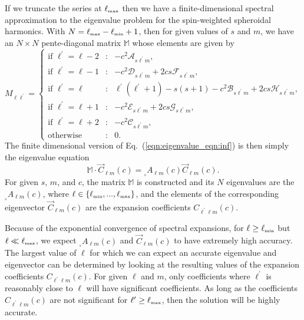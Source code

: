\documentclass[11pt]{article}
\newcommand{\scA}[4][]{{}_{{}_{#2}}A^{#1}_{#3}(#4)}
\begin{document}
If we truncate the series at $\ell_{\mbox{\tiny max}}$ then we have a
finite-dimensional spectral approximation to the eigenvalue problem
for the spin-weighted spheroidal harmonics.  With 
$N=\ell_{\mbox{\tiny max}} - \ell_{\mbox{\tiny min}} + 1$, then for
given values of $s$ and $m$, we have an $N\times{N}$ pente-diagonal
matrix $\mathbb{M}$ whose elements are given by
\begin{equation}
  M_{\ell\ell^\prime} = \left\{\begin{array}{lcl}
  \mbox{if\ }\ell^\prime=\ell-2 &:& -c^2 \mathcal{A}_{s\ell^\prime{m}}, \\
  \mbox{if\ }\ell^\prime=\ell-1 &:& -c^2 \mathcal{D}_{s\ell^\prime{m}} 
                                   + 2cs \mathcal{F}_{s\ell^\prime{m}} ,\\
  \mbox{if\ }\ell^\prime=\ell &:& \ell^\prime(\ell^\prime+1)-s(s+1)
                                   - c^2 \mathcal{B}_{s\ell^\prime{m}} 
                                   + 2cs \mathcal{H}_{s\ell^\prime{m}}, \\
  \mbox{if\ }\ell^\prime=\ell+1 &:& -c^2 \mathcal{E}_{s\ell^\prime{m}} 
                                   + 2cs \mathcal{G}_{s\ell^\prime{m}}, \\
  \mbox{if\ }\ell^\prime=\ell+2 &:& -c^2 \mathcal{C}_{s\ell^\prime{m}}, \\
  \mbox{otherwise} &:& 0.
  \end{array}\right.
\end{equation}
The finite dimensional version of Eq.~(\ref{eqn:eigenvalue_eqn:inf}) is 
then simply the eigenvalue equation
\begin{equation}\label{eqn::eigenvalue_eqn:fin}
  \mathbb{M}\cdot\vec{C}_{\ell{m}}(c) = \scA{s}{\ell{m}}{c}\vec{C}_{\ell{m}}(c).
\end{equation}
For given $s$, $m$, and $c$, the matrix $\mathbb{M}$ is constructed
and its $N$ eigenvalues are the $\scA{s}{\ell{m}}{c}$, where $\ell\in
\{\ell_{\mbox{\tiny min}},...,\ell_{\mbox{\tiny max}}\}$, and the
elements of the corresponding eigenvector $\vec{C}_{\ell{m}}(c)$ are the
expansion coefficients $C_{\ell^\prime\ell{m}}(c)$.

Because of the exponential convergence of spectral expansions, for 
$\ell \ge \ell_{\mbox{\tiny min}}$ but $\ell \ll \ell_{\mbox{\tiny max}}$, 
we expect $\scA{s}{\ell{m}}{c}$ and $\vec{C}_{\ell{m}}(c)$ to have
extremely high accuracy.  The largest value of $\ell$ for which we
can expect an accurate eigenvalue and eigenvector can be determined
by looking at the resulting values of the expansion coefficients 
$C_{\ell^\prime\ell{m}}(c)$.  For given $\ell$ and $m$, only coefficients
where $\ell^\prime$ is reasonably close to $\ell$ will have significant
coefficients.  As long as the coefficients $C_{\ell^\prime\ell{m}}(c)$ are
not significant for $\ell^\prime \ge \ell_{\mbox{\tiny max}}$, then 
the solution will be highly accurate.
\end{document}
